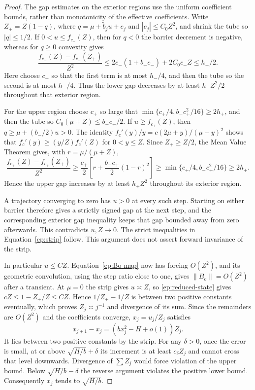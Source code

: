 \begin{proof}
The gap estimates on the exterior regions use the uniform
coefficient bounds, rather than monotonicity of the effective
coefficients. Write
$Z_+=Z(1-q)$, where
$q=\mu+\widetilde b_j u+e_j$ and $|e_j|\le C_0Z^2$,
and shrink the tube so $|q|\le1/2$.
If $0<u\le f_{c_-}(Z)$, then for $q<0$ the barrier
decrement is negative, whereas for $q\ge0$ convexity gives
\[
 \frac{f_{c_-}(Z)-f_{c_-}(Z_+)}{Z^2}
 \le 2c_-(1+b_+c_-)+2C_0c_-Z\le h_-/2 .
\]
Here choose $c_-$ so that the first term is at most
$h_-/4$, and then the tube so the second is at most
$h_-/4$. Thus the lower gap decreases by at least
$h_-Z^2/2$ throughout that exterior region.

For the upper region choose $c_+$ so large that
$\min\{c_+/4,b_-c_+^2/16\}\ge2h_+$, and then the
tube so $C_0(\mu+Z)\le b_-c_+/2$.
If $u\ge f_{c_+}(Z)$, then
$q\ge\mu+(b_-/2)u>0$.
The identity
$f_c'(y)/y=c(2\mu+y)/(\mu+y)^2$ shows that
$f_c'(y)\ge(y/Z)f_c'(Z)$ for $0<y\le Z$.
Since $Z_+\ge Z/2$, the Mean Value Theorem gives,
with $r=\mu/(\mu+Z)$,
\[
 \frac{f_{c_+}(Z)-f_{c_+}(Z_+)}{Z^2}
 \ge\frac{c_+}{2}
      \left[r+\frac{b_-c_+}{2}(1-r)^2\right]
 \ge\min\{c_+/4,b_-c_+^2/16\}\ge2h_+ .
\]
Hence the upper gap increases by at least $h_+Z^2$
throughout its exterior region.

A trajectory converging to zero has $u>0$ at every
such step. Starting on either barrier therefore gives
a strictly signed gap at the next step, and the
corresponding exterior gap inequality keeps that gap
bounded away from zero afterwards. This contradicts
$u,Z\to0$. The strict inequalities in
Equation~\eqref{ep:strip} follow. This argument does
not assert forward invariance of the strip.

In particular $u\le C Z$.  Equation~\eqref{ep:Bo-map}
now has forcing $O(Z^2)$, and its geometric convolution,
using the step ratio close to one, gives
$\|B_o\|=O(Z^2)$ after a transient.
At $\mu=0$ the strip gives $u\asymp Z$, so
\eqref{ep:reduced-state} gives
$cZ\le1-Z_+/Z\le CZ$.  Hence
$1/Z_+-1/Z$ is between two positive constants eventually,
which proves $Z_j\asymp j^{-1}$ and divergence of its sum.
Since the remainders are $O(Z^2)$ and the coefficients
converge, $x_j=u_j/Z_j$ satisfies
\[
 x_{j+1}-x_j=(bx_j^2-H+o(1))Z_j .
\]
It lies between two positive constants by the strip.
For any $\delta>0$, once the error is small, at or above
$\sqrt{H/b}+\delta$ its increment is at least $c_\delta Z_j$
and cannot cross that level downwards.  Divergence of
$\sum Z_j$ would force violation of the upper bound.
Below $\sqrt{H/b}-\delta$ the reverse argument violates
the positive lower bound.  Consequently $x_j$ tends to
$\sqrt{H/b}$.
\end{proof}


